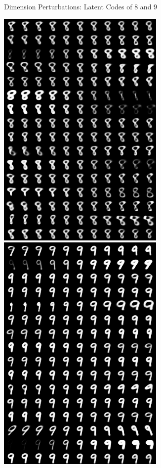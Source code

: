 \documentclass{beamer}
\begin{document}
{\begin{frame}{Dimension Perturbations: Latent Codes of $8$ and $9$}
      \begin{center}
        \includegraphics[width=.4\textwidth]{../img/recons-capsnet-keras/manipulate-8.png}
        \includegraphics[width=.4\textwidth]{../img/recons-capsnet-keras/manipulate-9.png}
      \end{center}
    \end{frame}
  }
\end{document}
